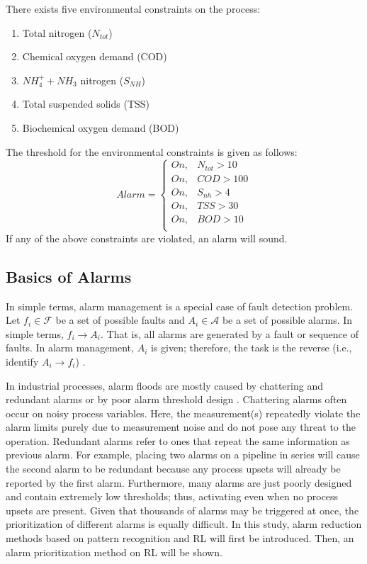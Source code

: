 There exists five environmental constraints on the process:
\begin{enumerate}
    \item Total nitrogen ($N_{tot}$)
    \item Chemical oxygen demand (COD)
    \item $NH_4^+ + NH_3$ nitrogen ($S_{NH}$)
    \item Total suspended solids (TSS)
    \item Biochemical oxygen demand (BOD)
\end{enumerate}
The threshold for the environmental constraints is given as follows:
\[
    Alarm = 
\begin{cases}
    On,              & N_{tot}  > 10 \\
    On,              & COD  >  100 \\
    On,              & S_{nh} >  4 \\
    On,              & TSS > 30 \\
    On,              & BOD > 10 \\
\end{cases}
\]
If any of the above constraints are violated, an alarm will sound.

\subsection{Basics of Alarms}
In simple terms, alarm management is a special case of fault detection problem. Let $f_i \in \mathcal{F}$ be a set of possible faults and $A_i \in \mathcal{A}$ be a set of possible alarms.  In simple terms, $f_i \rightarrow A_i$.  That is, all alarms are generated by a fault or sequence of faults. In alarm management, $A_i$ is given; therefore, the task is the reverse (i.e., identify $A_i \rightarrow f_i$) \cite{alarm_nn}.

In industrial processes, alarm floods are mostly caused by chattering and redundant alarms or by poor alarm threshold design \cite{alarm_manage}. Chattering alarms often occur on noisy process variables. Here, the measurement(s) repeatedly violate the alarm limits purely due to measurement noise and do not pose any threat to the operation.  Redundant alarms refer to ones that repeat the same information as previous alarm.  For example, placing two alarms on a pipeline in series will cause the second alarm to be redundant because any process upsets will already be reported by the first alarm. Furthermore, many alarms are just poorly designed and contain extremely low thresholds; thus, activating even when no process upsets are present.  Given that thousands of alarms may be triggered at once, the prioritization of different alarms is equally difficult.  In this study, alarm reduction methods based on pattern recognition and RL will first be introduced.  Then, an alarm prioritization method on RL will be shown.

